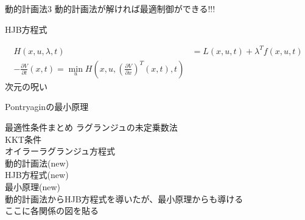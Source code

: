 \documentclass[dvipdfmx,12pt]{beamer}
\begin{document}
    \begin{frame}{動的計画法3}
        \footnotesize
        動的計画法が解ければ最適制御ができる!!! \\
    \end{frame}

    \begin{frame}{HJB方程式}
        \footnotesize
        
        \begin{align*}
            H(x, u, \lambda, t) &= L(x, u, t) + \lambda^T f(x, u, t) \\
            -\frac{\partial V}{\partial t}\left(x,t\right) = \min _u H\left(x, u, \left( \frac{\partial V}{\partial x} \right)^T\left(x, t\right), t \right)
        \end{align*}
        \centering
        次元の呪い\\
    \end{frame}

    \begin{frame}{Pontryaginの最小原理}
        \footnotesize

    \end{frame}

    \begin{frame}{最適性条件まとめ}
        \footnotesize
        ラグランジュの未定乗数法\\
        KKT条件\\
        オイラーラグランジュ方程式\\
        動的計画法(new)\\
        HJB方程式(new)\\
        最小原理(new)\\
        動的計画法からHJB方程式を導いたが、最小原理からも導ける\\

        ここに各関係の図を貼る
    \end{frame}
\end{document}
